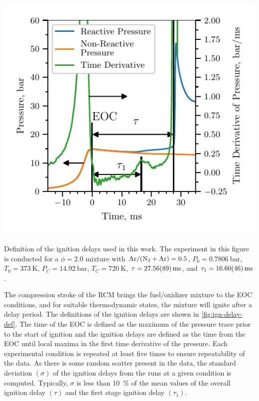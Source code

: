 \documentclass[letterpaper, review, sort&compress]{elsarticle}
\begin{document}
\begin{center}
    \captionsetup{type=figure}
    \includegraphics{figures/ignition_delay_definition.pdf}
    \caption{Definition of the ignition delays used in this work. The
    experiment in this figure is conducted for a \(\phi=2.0\) mixture with
    \mbox{\(\ce{Ar}/(\ce{N2}+\ce{Ar})=0.5\)}, \(P_0=\SI{0.7806}{\bar}\),
    \(T_0=\SI{373}{\K}\), \(P_C=\SI{14.92}{\bar}\), \(T_C=\SI{720}{\K}\),
    \(\tau=\SI{27.56\pm0.89}{\ms}\), and \(\tau_1=\SI{16.60\pm0.46}{\ms}\).}
    \label{fig:ign-delay-def}
\end{center}

The compression stroke of the RCM brings the fuel/oxidizer mixture to the EOC conditions, and for
suitable thermodynamic states, the mixture will ignite after a delay period. The definitions of the
ignition delays are shown in \cref{fig:ign-delay-def}. The time of the EOC is defined as the maximum
of the pressure trace prior to the start of ignition and the ignition delays are defined as the time
from the EOC until local maxima in the first time derivative of the pressure. Each experimental
condition is repeated at least five times to ensure repeatability of the data. As there is some
random scatter present in the data, the standard deviation \((\sigma)\) of the ignition delays from
the runs at a given condition is computed. Typically, \(\sigma\) is less than \SI{10}{\percent} of
the mean values of the overall ignition delay \((\tau)\) and the first stage ignition delay
\((\tau_1)\).
\end{document}
